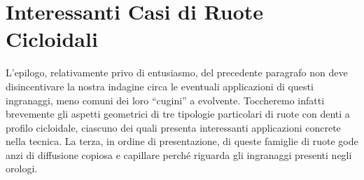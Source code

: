 \section{Interessanti Casi di Ruote Cicloidali}

L'epilogo, relativamente privo di entusiasmo, del precedente paragrafo non
deve disincentivare la nostra indagine circa le eventuali applicazioni di questi
ingranaggi, meno comuni dei loro ``cugini'' a evolvente.
Toccheremo infatti brevemente gli aspetti geometrici
di tre tipologie particolari di
ruote con denti a profilo cicloidale, ciascuno dei quali presenta
interessanti applicazioni
concrete nella tecnica. La terza, in ordine di presentazione,
di queste famiglie di ruote gode anzi
di diffusione copiosa e capillare
perch\'e riguarda gli ingranaggi presenti negli orologi.

